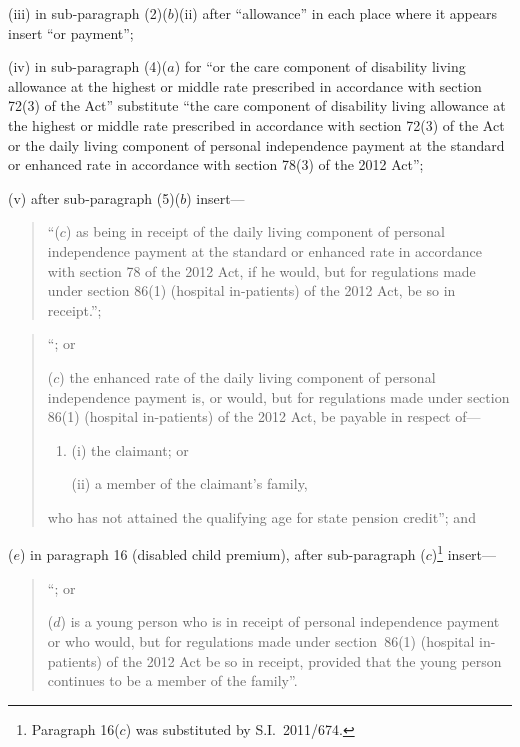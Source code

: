 \documentclass[12pt,a4paper]{article}
\begin{document}
\begin{enumerate}
\begin{enumerate}
(iii) in sub-paragraph (2)($b$)(ii)  after “allowance” in each place where it appears insert “or payment”;

(iv) in sub-paragraph (4)($a$)  for “or the care component of disability living allowance at the highest or middle rate prescribed in accordance with section 72(3) of the Act” substitute “the care component of disability living allowance at the highest or middle rate prescribed in accordance with section 72(3) of the Act or the daily living component of personal independence payment at the standard or enhanced rate in accordance with section 78(3) of the 2012 Act”;

(v) after sub-paragraph (5)($b$)  insert—
\begin{quotation}
“($c$) as being in receipt of the daily living component of personal independence payment at the standard or enhanced rate in accordance with section 78 of the 2012 Act, if he would, but for regulations made under section 86(1) (hospital in-patients) of the 2012 Act, be so in receipt.”;
\end{quotation}
\end{enumerate}

\begin{quotation}
“; or

($c$) the enhanced rate of the daily living component of personal independence payment is, or would, but for regulations made under section 86(1) (hospital in-patients) of the 2012 Act, be payable in respect of—
\begin{enumerate}\item[]
(i) the claimant; or

(ii) a member of the claimant’s family,
\end{enumerate}
who has not attained the qualifying age for state pension credit”; and
\end{quotation}

($e$) in paragraph 16 (disabled child premium), after sub-paragraph ($c$)\footnote{Paragraph 16($c$)  was substituted by S.I.~2011/674.} insert—
\begin{quotation}
“; or

($d$) is a young person who is in receipt of personal independence payment or who would, but for regulations made under section~86(1) (hospital in-patients) of the 2012 Act be so in receipt, provided that the young person continues to be a member of the family”.
\end{quotation}
\end{enumerate}
\end{document}
